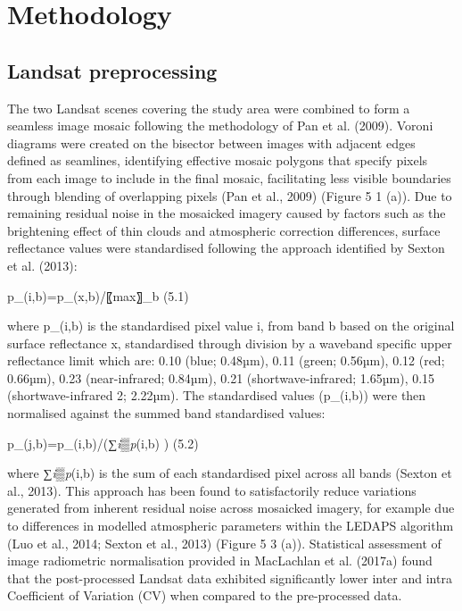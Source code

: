 \documentclass[]{book}
\begin{document}
\section{Methodology}\label{methodology}

\subsection{Landsat preprocessing}\label{landsat-preprocessing}

The two Landsat scenes covering the study area were combined to form a
seamless image mosaic following the methodology of Pan et al. (2009).
Voroni diagrams were created on the bisector between images with
adjacent edges defined as seamlines, identifying effective mosaic
polygons that specify pixels from each image to include in the final
mosaic, facilitating less visible boundaries through blending of
overlapping pixels (Pan et al., 2009) (Figure 5 1 (a)). Due to remaining
residual noise in the mosaicked imagery caused by factors such as the
brightening effect of thin clouds and atmospheric correction
differences, surface reflectance values were standardised following the
approach identified by Sexton et al. (2013):

p\_(i,b)=p\_(x,b)/〖max〗\_b (5.1)

where p\_(i,b) is the standardised pixel value i, from band b based on
the original surface reflectance x, standardised through division by a
waveband specific upper reflectance limit which are: 0.10 (blue;
0.48µm), 0.11 (green; 0.56µm), 0.12 (red; 0.66µm), 0.23 (near-infrared;
0.84µm), 0.21 (shortwave-infrared; 1.65µm), 0.15 (shortwave-infrared 2;
2.22µm). The standardised values (p\_(i,b)) were then normalised against
the summed band standardised values:

p\_(j,b)=p\_(i,b)/(∑\emph{i▒p}(i,b) ) (5.2)

where ∑\emph{i▒p}(i,b) is the sum of each standardised pixel across all
bands (Sexton et al., 2013). This approach has been found to
satisfactorily reduce variations generated from inherent residual noise
across mosaicked imagery, for example due to differences in modelled
atmospheric parameters within the LEDAPS algorithm (Luo et al., 2014;
Sexton et al., 2013) (Figure 5 3 (a)). Statistical assessment of image
radiometric normalisation provided in MacLachlan et al. (2017a) found
that the post-processed Landsat data exhibited significantly lower inter
and intra Coefficient of Variation (CV) when compared to the
pre-processed data.
\end{document}
